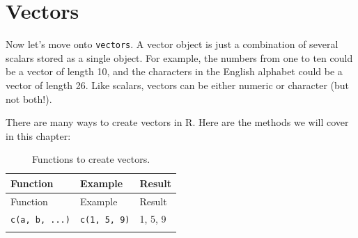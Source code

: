 \documentclass[]{book}
\theoremstyle{definition}
\theoremstyle{definition}
\theoremstyle{remark}
\begin{document}
\section{Vectors}\label{vectors}

Now let's move onto \texttt{vectors}. A vector object is just a
combination of several scalars stored as a single object. For example,
the numbers from one to ten could be a vector of length 10, and the
characters in the English alphabet could be a vector of length 26. Like
scalars, vectors can be either numeric or character (but not both!).

There are many ways to create vectors in R. Here are the methods we will
cover in this chapter:

\begin{longtable}[]{@{}lll@{}}
\caption{Functions to create vectors.}\tabularnewline
\toprule
\begin{minipage}[b]{0.34\columnwidth}\raggedright\strut
Function\strut
\end{minipage} & \begin{minipage}[b]{0.39\columnwidth}\raggedright\strut
Example\strut
\end{minipage} & \begin{minipage}[b]{0.15\columnwidth}\raggedright\strut
Result\strut
\end{minipage}\tabularnewline
\midrule
\endfirsthead
\toprule
\begin{minipage}[b]{0.34\columnwidth}\raggedright\strut
Function\strut
\end{minipage} & \begin{minipage}[b]{0.39\columnwidth}\raggedright\strut
Example\strut
\end{minipage} & \begin{minipage}[b]{0.15\columnwidth}\raggedright\strut
Result\strut
\end{minipage}\tabularnewline
\midrule
\endhead
\begin{minipage}[t]{0.34\columnwidth}\raggedright\strut
\texttt{c(a,\ b,\ ...)}\strut
\end{minipage} & \begin{minipage}[t]{0.39\columnwidth}\raggedright\strut
\texttt{c(1,\ 5,\ 9)}\strut
\end{minipage} & \begin{minipage}[t]{0.15\columnwidth}\raggedright\strut
1, 5, 9\strut
\end{minipage}\tabularnewline
\begin{minipage}[t]{0.34\columnwidth}\raggedright\strut

\end{minipage}
\end{longtable}
\end{document}
